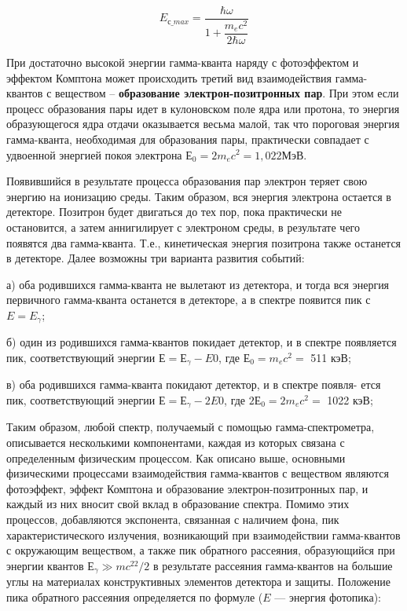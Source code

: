 \documentclass[a4paper,12pt]{article} %
\begin{document}
	\begin{equation}\label{E_compton}
		E_{с \_ max} = \dfrac{\hbar \omega}{1 + \dfrac{m_ec^2}{2\hbar\omega}}
	\end{equation}
	
	При достаточно высокой энергии гамма-кванта наряду с фотоэффектом и эффектом Комптона может происходить третий вид взаимодействия гамма-квантов с веществом – \textbf{образование электрон-позитронных пар}. При этом если процесс образования пары идет в кулоновском поле ядра или протона, то энергия образующегося ядра отдачи оказывается весьма малой, так что пороговая энергия гамма-кванта, необходимая для образования пары, практически совпадает с удвоенной энергией покоя электрона $ Е_0 = 2m_ec^2 =1,022  $МэВ.
	
	Появившийся в результате процесса образования пар электрон теряет свою энергию на ионизацию среды. Таким образом, вся энергия электрона остается в детекторе. Позитрон будет двигаться до тех пор, пока практически не остановится, а затем аннигилирует с электроном среды, в результате чего появятся два гамма-кванта. Т.е., кинетическая энергия позитрона также останется в детекторе. Далее возможны три варианта развития событий:
	
	а) оба родившихся гамма-кванта не вылетают из детектора, и тогда вся энергия первичного гамма-кванта останется в детекторе, а в спектре появится пик с $ E = E_\gamma $;
	
	б) один из родившихся гамма-квантов покидает детектор, и в спектре появляется пик, соответствующий энергии $  Е = Е_\gamma - E0 $, где $ Е_0 = m_ec^2 = $ 511 кэВ;
	
	в) оба родившихся гамма-кванта покидают детектор, и в спектре появля- ется пик, соответствующий энергии $  Е = Е_\gamma - 2E0 $, где $ 2Е_0 = 2m_ec^2 = $ 1022 кэВ;
	
	Таким образом, любой спектр, получаемый с помощью гамма-спектрометра, описывается несколькими компонентами, каждая из которых связана с определенным физическим процессом. Как описано выше, основными физическими процессами взаимодействия гамма-квантов с веществом являются фотоэффект, эффект Комптона и образование электрон-позитронных пар, и каждый из них вносит свой вклад в образование спектра. Помимо этих процессов, добавляются экспонента, связанная с наличием фона, пик характеристического излучения, возникающий при взаимодействии гамма-квантов с окружающим веществом, а также пик обратного рассеяния, образующийся при энергии квантов $ Е_\gamma \gg mc^22/2 $ в результате рассеяния гамма-квантов на большие углы на материалах конструктивных элементов детектора и защиты. Положение пика обратного рассеяния определяется по формуле ($ E $ --- энергия фотопика):
	
\end{document}
